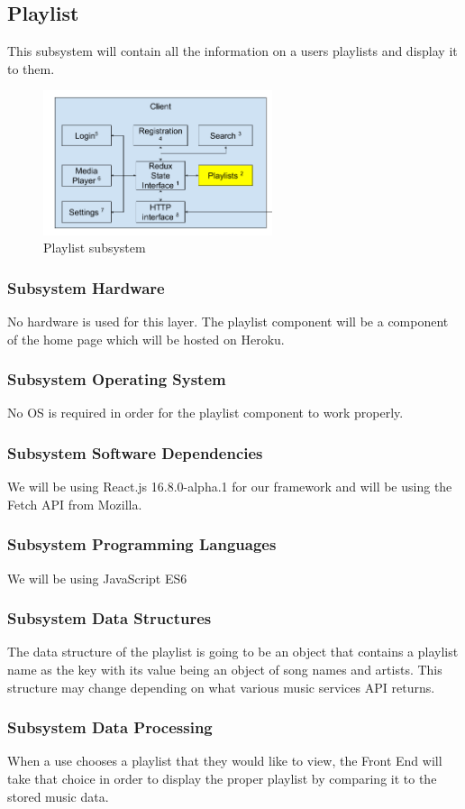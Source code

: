 \subsection{Playlist}
This subsystem will contain all the information on a users playlists and display it to them.

\begin{figure}[h!]
	\centering
 	\includegraphics[width=0.60\textwidth]{images/client/client_playlists.png}
 	\caption{Playlist subsystem}
\end{figure}

\subsubsection{Subsystem Hardware}
No hardware is used for this layer. The playlist component will be a component of the home page which will be hosted on Heroku.

\subsubsection{Subsystem Operating System}
No OS is required in order for the playlist component to work properly.

\subsubsection{Subsystem Software Dependencies}
We will be using React.js 16.8.0-alpha.1 for our framework and will be using the Fetch API from Mozilla.

\subsubsection{Subsystem Programming Languages}
We will be using JavaScript ES6

\subsubsection{Subsystem Data Structures}
The data structure of the playlist is going to be an object that contains a playlist name as the key with its value being an object of song names and artists. This structure may change depending on what various music services API returns.

\subsubsection{Subsystem Data Processing}
When a use chooses a playlist that they would like to view, the Front End will take that choice in order to display the proper playlist by comparing it to the stored music data.

\newpage